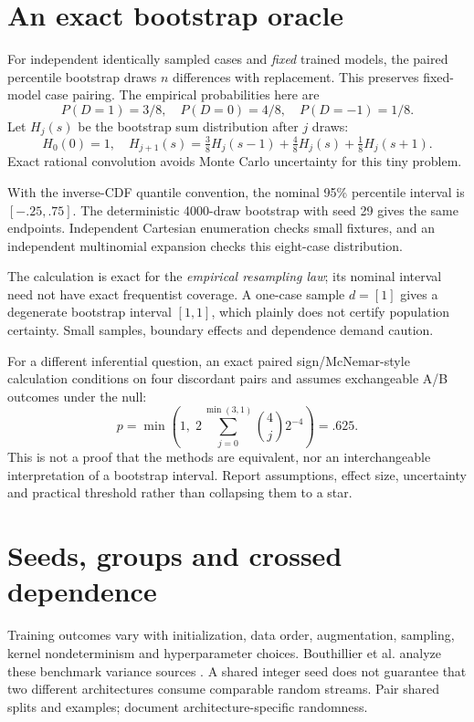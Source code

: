 \section{An exact bootstrap oracle}
For independent identically sampled cases and \emph{fixed} trained models, the
paired percentile bootstrap draws $n$ differences with replacement.
This  preserves fixed-model case pairing.
The empirical probabilities here are
\[
 P(D=1)=3/8,\quad P(D=0)=4/8,\quad P(D=-1)=1/8.
\]
Let $H_j(s)$ be the bootstrap sum distribution after $j$ draws:
\[
 H_0(0)=1,\quad
 H_{j+1}(s)=\tfrac38 H_j(s-1)+\tfrac48 H_j(s)+\tfrac18 H_j(s+1).
\]
Exact rational convolution avoids Monte Carlo uncertainty for this tiny problem.
\par\medskip\noindent\begin{minipage}{\linewidth}
\end{minipage}\par\medskip
With the inverse-CDF quantile convention, the nominal 95\% percentile interval is
$[-.25,.75]$. The deterministic 4000-draw bootstrap with seed 29 gives the same
endpoints. Independent Cartesian enumeration checks small fixtures, and an
independent multinomial expansion checks this eight-case distribution.

The calculation is exact for the \emph{empirical resampling law}; its nominal
interval need not have exact frequentist coverage. A one-case sample $d=[1]$
gives a degenerate bootstrap interval $[1,1]$, which plainly does not certify
population certainty. Small samples, boundary effects and dependence demand
caution.

For a different inferential question, an exact paired sign/McNemar-style calculation
conditions on four discordant pairs and assumes exchangeable A/B outcomes under
the null:
\[
 p=\min\left(1,\;2\sum_{j=0}^{\min(3,1)}
                {4\choose j}2^{-4}\right)=.625.
\]
This is not a proof that the methods are equivalent, nor an interchangeable
interpretation of a bootstrap interval. Report assumptions, effect size,
uncertainty and practical threshold rather than collapsing them to a star.

\section{Seeds, groups and crossed dependence}
Training outcomes vary with initialization, data order, augmentation, sampling,
kernel nondeterminism and hyperparameter choices. Bouthillier et al. analyze
these benchmark variance sources \cite{evod29:variance}. A shared integer seed
does not guarantee that two different architectures consume comparable random
streams. Pair shared splits and examples; document architecture-specific randomness.

